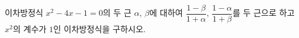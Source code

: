 이차방정식 $x^2-4x-1=0$의 두 근 $\alpha$, $\beta$에 대하여 $\dfrac{1-\beta}{1+\alpha}$, $\dfrac{1-\alpha}{1+\beta}$를 두 근으로 하고 $x^2$의 계수가 $1$인 이차방정식을 구하시오.
